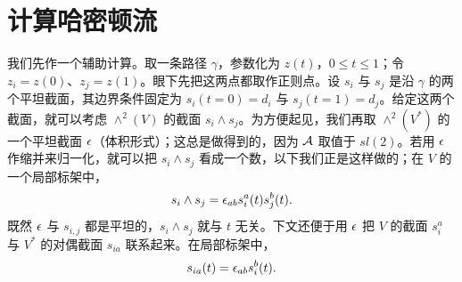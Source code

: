 
\section{计算哈密顿流}
\label{app:poorman}

我们先作一个辅助计算。取一条路径 $\gamma$，参数化为 $z(t)$，$0\le t\le 1$；令 $z_i=z(0)$、$z_j=z(1)$。眼下先把这两点都取作正则点。设 $s_i$ 与 $s_j$ 是沿 $\gamma$ 的两个平坦截面，其边界条件固定为 $s_i(t=0)=d_i$ 与 $s_j(t=1)=d_j$。给定这两个截面，就可以考虑 $\wedge^2(V)$ 的截面 $s_i\wedge s_j$。为方便起见，我们再取 $\wedge^2(V^*)$ 的一个平坦截面 $\epsilon$（体积形式）；这总是做得到的，因为 $\mathcal{A}$ 取值于 $sl(2)$。若用 $\epsilon$ 作缩并来归一化，就可以把 $s_i\wedge s_j$ 看成一个数，以下我们正是这样做的；在 $V$ 的一个局部标架中，
\begin{equation}
s_i \wedge s_j = \epsilon_{ab} s_i^a(t) s_j^b(t).
\end{equation}
既然 $\epsilon$ 与 $s_{i,j}$ 都是平坦的，$s_i\wedge s_j$ 就与 $t$ 无关。下文还便于用 $\epsilon$ 把 $V$ 的截面 $s_i^a$ 与 $V^*$ 的对偶截面 $s_{ia}$ 联系起来。在局部标架中，
\begin{equation}
s_{ia}(t) = \epsilon_{ab} s_i^b(t).
\end{equation}

